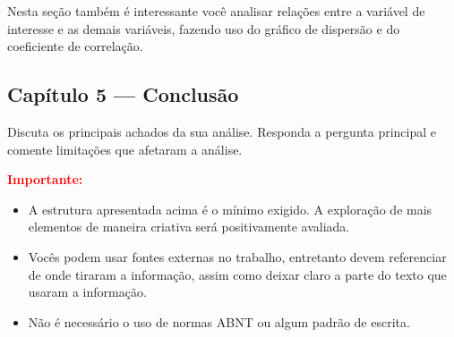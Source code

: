 \documentclass[12pt]{article}
\begin{document}
Nesta seção também é interessante você analisar relações entre a variável de interesse e as demais variáveis, fazendo uso do gráfico de dispersão e do coeficiente de correlação. 

\subsection*{Capítulo 5 — Conclusão}
Discuta os principais achados da sua análise. Responda a pergunta principal e comente limitações que afetaram a análise.

\textcolor{red}{\textbf{Importante:}} 
\begin{itemize}
    \item A estrutura apresentada acima é o mínimo exigido. A exploração de mais elementos de maneira criativa será positivamente avaliada.
    \item Vocês podem usar fontes externas no trabalho, entretanto devem referenciar de onde tiraram a informação, assim como deixar claro a parte do texto que 
    usaram a informação. 
    \item Não é necessário o uso de normas ABNT ou algum padrão de escrita. 
\end{itemize}
\end{document}

